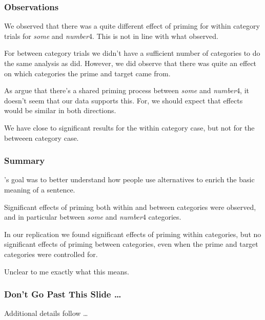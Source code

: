 \documentclass[noamssymb]{beamer}
\begin{document}
\begin{frame}
  \frametitle{{\ftf Observations}}
  We observed that there was a quite different effect of priming for within category trials for \emph{some} and \emph{number}4.
  This is not in line with what \citeauthor{Bott:2016aa} observed.

  For between category trials we didn't have a sufficient number of categories to do the same analysis as \citeauthor{Bott:2016aa} did.
  However, we did observe that there was quite an effect on which categories the prime and target came from.

  As \citeauthor{Bott:2016aa} argue that there's a shared priming process between \emph{some} and \emph{number}4, it doesn't seem that our data supports this.
  For, we should expect that effects would be similar in both directions.

  We have close to significant results for the within category case, but not for the betweeen category case.

\end{frame}


\begin{frame}
  \frametitle{{\ftf Summary}}

  \citeauthor{Bott:2016aa}'s goal  was to better understand how people use alternatives to enrich the basic meaning of a sentence.

  Significant effects of priming both within and between categories were observed, and in particular between \emph{some} and \emph{number}4 categories.

  In our replication we found significant effects of priming within categories, but no significant effects of priming between categories, even when the prime and target categories were controlled for.

  Unclear to me exactly what this means.

\end{frame}


\appendix


\begin{frame}
  \frametitle{{\ftf Don't Go Past This Slide \dots}}

  Additional details follow \dots
\end{frame}
\end{document}
